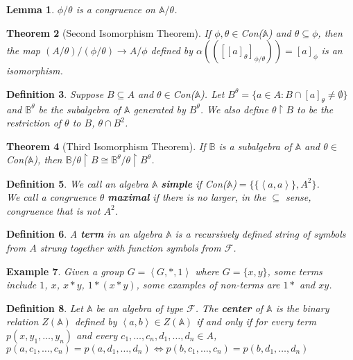 \documentclass[12pt,a4paper]{article}
\newtheorem{theorem}{Theorem}[section]
\newtheorem{lemma}[theorem]{Lemma}
\newtheorem{example}[theorem]{Example}
\newtheorem{definition}[theorem]{Definition}
\begin{document}
\begin{lemma}
$\phi/\theta$ is a congruence on $\mathbb{A}/\theta$.
\end{lemma}

\begin{theorem}[Second Isomorphism Theorem]
If $\phi,\theta\in$Con($\mathbb{A}$) and $\theta\subseteq\phi$, then the map $(A/\theta)/(\phi/\theta)\to A/\phi$ defined by $\alpha(([[a]_\theta]_{\phi/\theta}))=[a]_\phi$ is an isomorphism.
\end{theorem}

\begin{definition}
Suppose $B\subseteq A$ and $\theta\in$Con($\mathbb{A}$). Let $B^\theta=\{a\in A:B\cap[a]_\theta\neq\emptyset\}$ and $\mathbb{B}^\theta$ be the subalgebra of $\mathbb{A}$ generated by $B^\theta$. We also define  $\theta\upharpoonright B$ to be the restriction of $\theta$ to $B$, $\theta\cap B^2$.
\end{definition}

\begin{theorem}[Third Isomorphism Theorem]
If $\mathbb{B}$ is a subalgebra of $\mathbb{A}$ and $\theta\in$Con($\mathbb{A}$), then $\mathbb{B}/\theta\upharpoonright B\cong\mathbb{B}^\theta/\theta\upharpoonright B^\theta$.
\end{theorem}

\begin{definition}
We call an algebra $\mathbb{A}$ \textbf{simple} if Con($\mathbb{A}$)$=\{\{\left<a,a\right>\},A^2\}$.\\
We call a congruence $\theta$ \textbf{maximal} if there is no larger, in the $\subseteq$ sense, congruence that is not $A^2$.
\end{definition}

\begin{definition}
A \textbf{term} in an algebra $\mathbb{A}$ is a recursively defined string of symbols from $A$ strung together with function symbols from $\mathcal{F}$.
\end{definition}

\begin{example}
Given a group $G=\left<G,*,1\right>$ where $G=\{x,y\}$, some terms include $1$, $x$, $x*y$, $1*(x*y)$, some examples of non-terms are $1*$ and $xy$.
\end{example}

\begin{definition}
Let $\mathbb{A}$ be an algebra of type $\mathcal{F}$. The \textbf{center} of $\mathbb{A}$ is the binary relation $Z(\mathbb{A})$ defined by $\left<a,b\right>\in Z(\mathbb{A})$ if and only if for every term $p(x,y_1,\ldots,y_n)$ and every $c_1,\ldots,c_n,d_1,\ldots,d_n\in A$, $p(a,c_1,\ldots,c_n)=p(a,d_1,\ldots,d_n)\iff p(b,c_1,\ldots,c_n)=p(b,d_1,\ldots,d_n)$
\end{definition}
\end{document}
